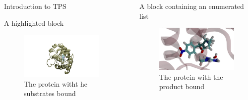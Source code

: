 \documentclass[final]{beamer}
\newlength{\sepwidth}
\newlength{\colwidth}
\newcommand{\separatorcolumn}{\begin{column}{\sepwidth}\end{column}}
\begin{document}
\begin{frame}[t]
\begin{columns}[t]
\begin{column}{\colwidth}
\begin{block}{Introduction to TPS}
    

  \end{block}

  \begin{block}{A highlighted block}
    \begin{figure}
        \centering
        \includegraphics[scale=0.5]{figures/reac-121.png}
        \caption{The protein witht he substrates bound}
    \end{figure}

  \end{block}

\end{column}

\separatorcolumn

\begin{column}{\colwidth}

  \begin{block}{A block containing an enumerated list}
   \begin{figure}
        \centering
        \includegraphics[scale=0.2]{figures/prod-121.png}
        \caption{The protein with the product bound}
    \end{figure}
    

\end{block}
\end{column}
\end{columns}
\end{frame}
\end{document}

